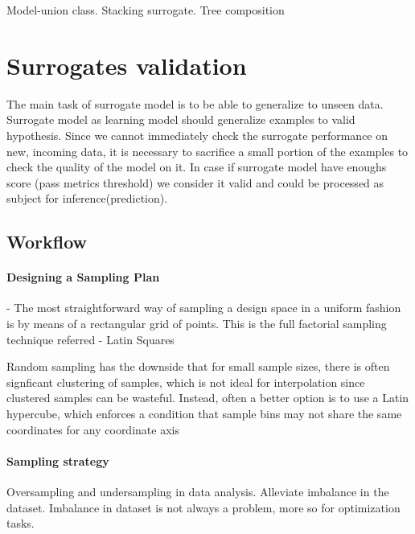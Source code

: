     Model-union class.  Stacking surrogate.  Tree composition


\section{Surrogates validation}
The main task of surrogate model is to be able to generalize to unseen data. Surrogate model as learning model should generalize examples to valid hypothesis. 
Since we cannot immediately check the surrogate performance on new, incoming data, it is necessary to sacrifice a small portion of the examples to check the quality of the model on it. In case if surrogate model have enoughs score (pass metrics threshold) we consider it valid and could be processed as subject for inference(prediction).

    \subsection{Workflow}
    \paragraph{Designing a Sampling Plan} - The most straightforward way of sampling a design space in a uniform fashion is by \cite{EngSurMod}
    means of a rectangular grid of points. This is the full factorial sampling technique referred
    - Latin Squares

    Random sampling has the downside that for small sample sizes, there is often signficant clustering of samples, which is not ideal for interpolation since clustered samples can be wasteful. Instead, often a better option is to use a Latin hypercube, which enforces a condition that sample bins may not share the same coordinates for any coordinate axis


    \paragraph{Sampling strategy} Oversampling and undersampling in data analysis. Alleviate imbalance in the dataset. 
    Imbalance in dataset is not always a problem, more so for optimization tasks. 

